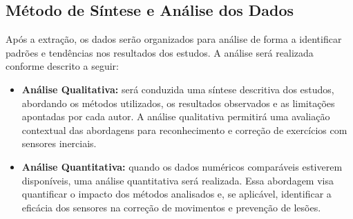 \documentclass[a4paper,12pt]{article}
\begin{document}
\subsection{Método de Síntese e Análise dos Dados}

Após a extração, os dados serão organizados para análise de forma a identificar padrões e tendências nos resultados dos estudos. A análise será realizada conforme descrito a seguir:

\begin{itemize}
    \item \textbf{Análise Qualitativa:} será conduzida uma síntese descritiva dos estudos, abordando os métodos utilizados, os resultados observados e as limitações apontadas por cada autor. A análise qualitativa permitirá uma avaliação contextual das abordagens para reconhecimento e correção de exercícios com sensores inerciais.
    
    \item \textbf{Análise Quantitativa:} quando os dados numéricos comparáveis estiverem disponíveis, uma análise quantitativa será realizada. Essa abordagem visa quantificar o impacto dos métodos analisados e, se aplicável, identificar a eficácia dos sensores na correção de movimentos e prevenção de lesões.
\end{itemize}
\end{document}
